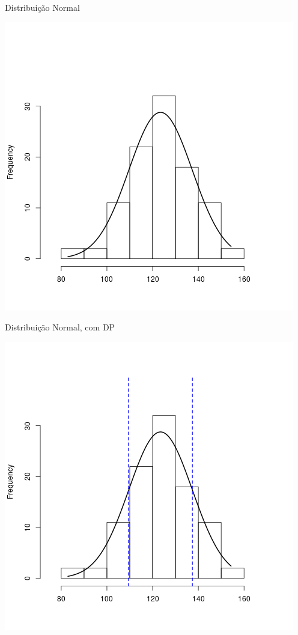 \documentclass{beamer}
\begin{document}
\begin{frame}{Distribuição Normal}
  \begin{center}
    \includegraphics[height=\textheight]{Cap4/normal2}
  \end{center}
\end{frame}

\begin{frame}{Distribuição Normal, com DP}
  \begin{center}
    \includegraphics[height=\textheight]{Cap4/normal4}
  \end{center}
\end{frame}
\end{document}
